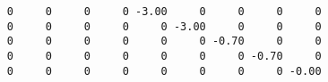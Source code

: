 \begin{example}
\begin{solution}
{\begin{verbatim}
     0     0     0     0 -3.00     0     0     0     0
     0     0     0     0     0 -3.00     0     0     0
     0     0     0     0     0     0 -0.70     0     0
     0     0     0     0     0     0     0 -0.70     0
     0     0     0     0     0     0     0     0 -0.00
\end{verbatim}
}%

\end{solution}
\end{example}
